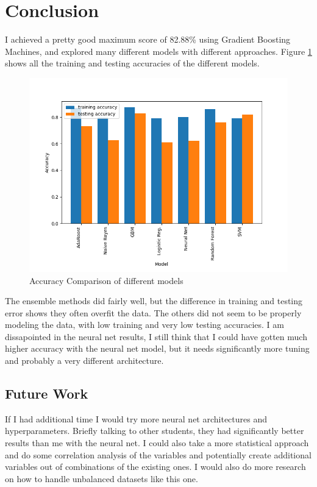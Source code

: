 \documentclass{article}
\begin{document}
\section{Conclusion}

I achieved a pretty good maximum score of 82.88\% using Gradient Boosting Machines, and explored many different models with different approaches. Figure \ref{fig:overall_acc} shows all the training and testing accuracies of the different models.

\begin{figure}[h]
    \centering
    \includegraphics[width=0.6\linewidth]{img/results.png}
    \caption{Accuracy Comparison of different models}
    \label{fig:overall_acc}
\end{figure}

The ensemble methods did fairly well, but the difference in training and testing error shows they often overfit the data. The others did not seem to be properly modeling the data, with low training and very low testing accuracies. I am dissapointed in the neural net results, I still think that I could have gotten much higher accuracy with the neural net model, but it needs significantly more tuning and probably a very different architecture. 

\subsection{Future Work}
If I had additional time I would try more neural net architectures and hyperparameters. Briefly talking to other students, they had significantly better results than me with the neural net. I could also take a more statistical approach and do some correlation analysis of the variables and potentially create additional variables out of combinations of the existing ones. I would also do more research on how to handle unbalanced datasets like this one.
\end{document}

